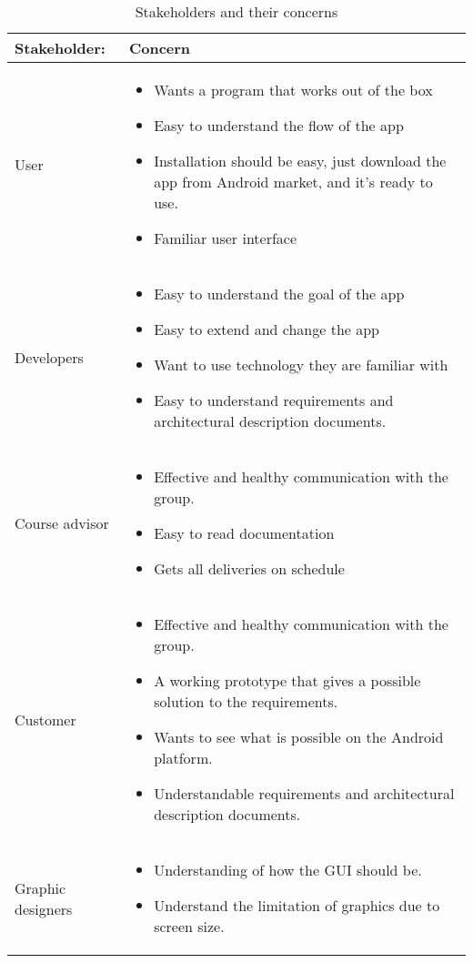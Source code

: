 \begin{table}
\begin{tabular}{p{3.5cm}|p{11.5cm}}
\textbf{Stakeholder:} & \textbf{Concern} \\ \hline \hline
User & 
\begin{itemize}
\item{} Wants a program that works out of the box
\item{} Easy to understand the flow of the app
\item{} Installation should be easy, just download the app from   Android market, and it’s ready to use.
\item{} Familiar user interface
\end{itemize}\\ \hline
Developers & 
\begin{itemize}
\item{}Easy to understand the goal of the app
\item{}Easy to extend and change the app
\item{}Want to use technology they are familiar with
\item{}Easy to understand requirements and architectural description documents.
\end{itemize}\\ \hline
Course advisor & 
\begin{itemize}
\item{}Effective and healthy communication with the group.
\item{}Easy to read documentation
\item{}Gets all deliveries on schedule
\end{itemize}\\ \hline
Customer & 
\begin{itemize}
\item{}Effective and healthy communication with the group.
\item{}A working prototype that gives a possible solution to the requirements.
\item{}Wants to see what is possible on the Android platform.
\item{}Understandable requirements and architectural description documents.
\end{itemize}\\ \hline
Graphic designers & 
\begin{itemize}
\item{}Understanding of how the GUI should be.
\item{}Understand the limitation of graphics due to screen size.
\end{itemize}
\end{tabular}
\caption{Stakeholders and their concerns} \label{tab:stakeholders}
\end{table}